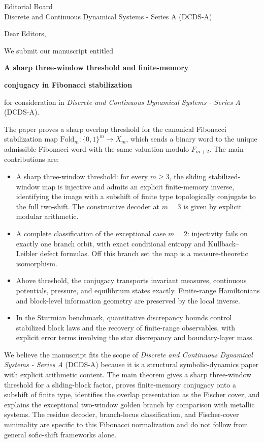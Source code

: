 \documentclass[11pt]{letter}
\date{\today}
\begin{document}
\begin{letter}{Editorial Board\\Discrete and Continuous Dynamical Systems - Series A (DCDS-A)}

\opening{Dear Editors,}

We submit our manuscript entitled

\medskip
\centerline{\textbf{A sharp three-window threshold and finite-memory}}
\centerline{\textbf{conjugacy in Fibonacci stabilization}}
\medskip

\noindent for consideration in \textit{Discrete and Continuous Dynamical Systems - Series A} (DCDS-A).

The paper proves a sharp overlap threshold for the canonical Fibonacci stabilization map $\mathrm{Fold}_m:\{0,1\}^m\to X_m$, which sends a binary word to the unique admissible Fibonacci word with the same valuation modulo $F_{m+2}$. The main contributions are:

\begin{itemize}
\item A sharp three-window threshold: for every $m\ge 3$, the sliding stabilized-window map is injective and admits an explicit finite-memory inverse, identifying the image with a subshift of finite type topologically conjugate to the full two-shift. The constructive decoder at $m=3$ is given by explicit modular arithmetic.

\item A complete classification of the exceptional case $m=2$: injectivity fails on exactly one branch orbit, with exact conditional entropy and Kullback--Leibler defect formulas. Off this branch set the map is a measure-theoretic isomorphism.

\item Above threshold, the conjugacy transports invariant measures, continuous potentials, pressure, and equilibrium states exactly. Finite-range Hamiltonians and block-level information geometry are preserved by the local inverse.

\item In the Sturmian benchmark, quantitative discrepancy bounds control stabilized block laws and the recovery of finite-range observables, with explicit error terms involving the star discrepancy and boundary-layer mass.
\end{itemize}

We believe the manuscript fits the scope of \textit{Discrete and Continuous Dynamical Systems - Series A} (DCDS-A) because it is a structural symbolic-dynamics paper with explicit arithmetic content. The main theorem gives a sharp three-window threshold for a sliding-block factor, proves finite-memory conjugacy onto a subshift of finite type, identifies the overlap presentation as the Fischer cover, and explains the exceptional two-window golden branch by comparison with metallic systems. The residue decoder, branch-locus classification, and Fischer-cover minimality are specific to this Fibonacci normalization and do not follow from general sofic-shift frameworks alone.


\end{letter}
\end{document}
